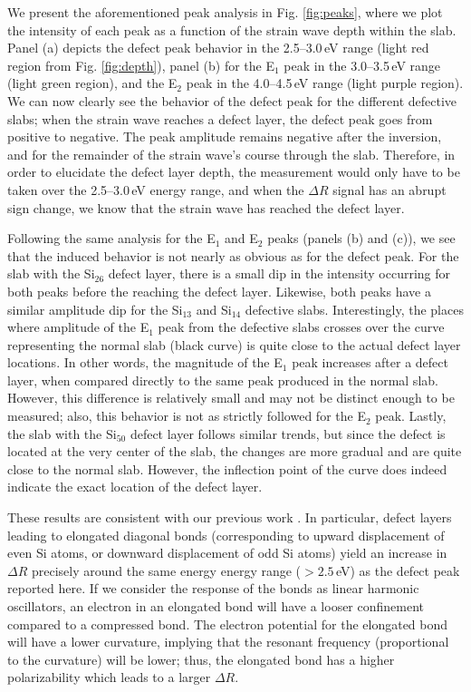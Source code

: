 \documentclass[aps,prb,10pt,showkeys,letterpaper,notitlepage,twocolumn]{revtex4-1}
\begin{document}
We present the aforementioned peak analysis in Fig. \ref{fig:peaks},
where we plot the intensity of each peak as a function of the strain wave depth
within the slab. Panel (a) depicts the defect peak behavior in the 2.5--3.0\,eV
range (light red region from Fig. \ref{fig:depth}), panel (b) for the E$_{1}$
peak in the 3.0--3.5\,eV range (light green region), and the E$_{2}$ peak in the
4.0--4.5\,eV range (light purple region). We can now clearly see the behavior of
the defect peak for the different defective slabs; when the strain wave reaches
a defect layer, the defect peak goes from positive to negative. The peak
amplitude remains negative after the inversion, and for the remainder of the
strain wave's course through the slab.
Therefore, in order to elucidate the defect layer depth, the measurement would
only have to be taken over the 2.5--3.0\,eV energy range, and when the $\Delta
R$ signal has an abrupt sign change, we know that the strain wave has reached
the defect layer.

Following the same analysis for the E$_{1}$ and E$_{2}$ peaks (panels (b) and
(c)), we see that the induced behavior is not nearly as obvious as for the
defect peak. For the slab with the Si$_{26}$ defect layer, there is a small dip
in the intensity occurring for both peaks before the reaching the defect layer.
Likewise, both peaks have a similar amplitude dip for the Si$_{13}$ and
Si$_{14}$ defective slabs. Interestingly, the places where amplitude of the
E$_{1}$ peak from the defective slabs crosses over the curve representing the
normal slab (black curve) is quite close to the actual defect layer locations.
In other words, the magnitude of the E$_{1}$ peak increases after a defect
layer, when compared directly to the same peak produced in the normal slab.
However, this difference is relatively small and may not be distinct enough to
be measured; also, this behavior is not as strictly followed for the E$_{2}$
peak. Lastly, the slab with the Si$_{50}$ defect layer follows similar trends,
but since the defect is located at the very center of the slab, the changes are
more gradual and are quite close to the normal slab. However, the inflection
point of the curve does indeed indicate the exact location of the defect layer.

These results are consistent with our previous work \cite{andersonPSSB18}. In
particular, defect layers leading to elongated diagonal bonds (corresponding to
upward displacement of even Si atoms, or downward displacement of odd Si atoms)
yield an increase in $\Delta R$ precisely around the same energy energy range
($>2.5$\,eV) as the defect peak reported here. If we consider the response of
the bonds as linear harmonic oscillators, an electron in an elongated bond will
have a looser confinement compared to a compressed bond. The electron potential
for the elongated bond will have a lower curvature, implying that the resonant
frequency (proportional to the curvature) will be lower; thus, the elongated
bond has a higher polarizability which leads to a larger $\Delta R$.
\end{document}
